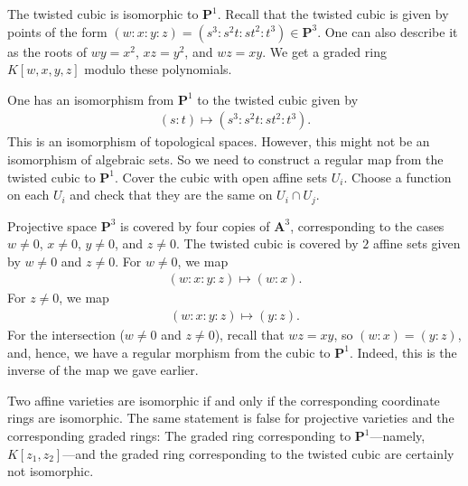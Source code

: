 \documentclass [11 pt, oneside] {article}
\begin{document}
\begin{example}\label{}
The twisted cubic is isomorphic to $\mathbf{P}^1$. Recall that the twisted cubic is given by points of the form $(w:x:y:z) = (s^3:s^2t:st^2:t^3)\in  \mathbf{P}^3$. One can also describe it as the roots of $wy=x^2$, $xz=y^2$, and $wz=xy$. We get a graded ring $K[w,x,y,z]$ modulo these polynomials.

One has an isomorphism from $\mathbf{P}^1$ to the twisted cubic given by 
\begin{align*}
	(s:t) \longmapsto  (s^3:s^2t:st^2:t^3).
\end{align*}
This is an isomorphism of topological spaces. However, this might not be an isomorphism of algebraic sets. So we need to construct a regular map from the twisted cubic to $\mathbf{P}^1$. Cover the cubic with open affine sets $U_i$. Choose a function on each $U_i$ and check that they are the same on $U_i\cap U_j$.

Projective space $\mathbf{P}^3$ is covered by four copies of $\mathbf{A}^3$, corresponding to the cases $w\ne 0$, $x\ne 0$, $y\ne 0$, and $z\ne 0$. The twisted cubic is covered by $2$ affine sets given by $w\ne 0$ and $z\ne 0$. For $w\ne 0$, we map
\begin{align*}
	(w:x:y:z)\longmapsto  (w:x).
\end{align*}
For $z\ne 0$, we map
\begin{align*}
	(w:x:y:z)\longmapsto  (y:z).
\end{align*}
For the intersection ($w\ne 0$ and $z\ne 0$), recall that $wz=xy$, so $(w:x)= (y:z)$, and, hence, we have a regular morphism from the cubic to $\mathbf{P}^1$. Indeed, this is the inverse of the map we gave earlier.
\end{example}

\begin{remark}
	Two affine varieties are isomorphic if and only if the corresponding coordinate rings are isomorphic. The same statement is false for projective varieties and the corresponding graded rings: The graded ring corresponding to $\mathbf{P}^1$---namely, $K[z_1,z_2]$---and the graded ring corresponding to the twisted cubic are certainly not isomorphic.
\end{remark}
\end{document}
